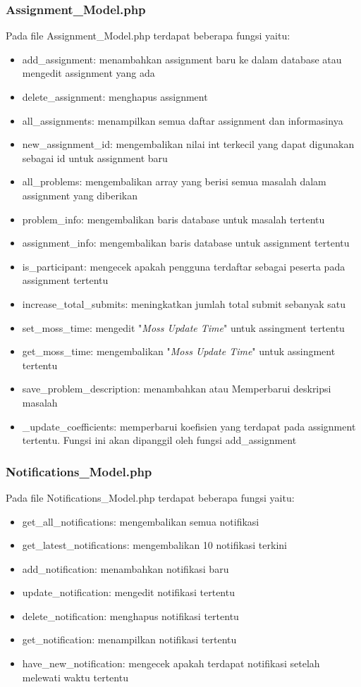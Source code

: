 \subsubsection{Assignment\_Model.php}
Pada file Assignment\_Model.php terdapat beberapa fungsi yaitu:
\begin{itemize}
	\item add\_assignment: menambahkan assignment baru ke dalam database atau mengedit assignment yang ada
	\item delete\_assignment: menghapus assignment 
	\item all\_assignments: menampilkan semua daftar assignment dan informasinya
	\item new\_assignment\_id: mengembalikan nilai int terkecil yang dapat digunakan sebagai id untuk assignment baru
	\item all\_problems: mengembalikan array yang berisi semua masalah dalam assignment yang diberikan
	\item problem\_info: mengembalikan baris database untuk masalah tertentu
	\item assignment\_info: mengembalikan baris database untuk assignment tertentu
	\item is\_participant: mengecek apakah pengguna terdaftar sebagai peserta pada assignment tertentu
	\item increase\_total\_submits: meningkatkan jumlah total submit sebanyak satu
	\item set\_moss\_time: mengedit "\textit{Moss Update Time}" untuk assingment tertentu
	\item get\_moss\_time: mengembalikan "\textit{Moss Update Time}" untuk assingment tertentu
	\item save\_problem\_description: menambahkan atau Memperbarui deskripsi masalah
	\item \_update\_coefficients: memperbarui koefisien yang terdapat pada assignment tertentu. Fungsi ini akan dipanggil oleh fungsi add\_assignment
\end{itemize}

\subsubsection{Notifications\_Model.php}
Pada file Notifications\_Model.php terdapat beberapa fungsi yaitu:
\begin{itemize}
	\item get\_all\_notifications: mengembalikan semua notifikasi
	\item get\_latest\_notifications: mengembalikan 10 notifikasi terkini
	\item add\_notification: menambahkan notifikasi baru
	\item update\_notification: mengedit notifikasi tertentu
	\item delete\_notification: menghapus notifikasi tertentu
	\item get\_notification: menampilkan notifikasi tertentu
	\item have\_new\_notification: mengecek apakah terdapat notifikasi setelah melewati waktu tertentu
\end{itemize}

